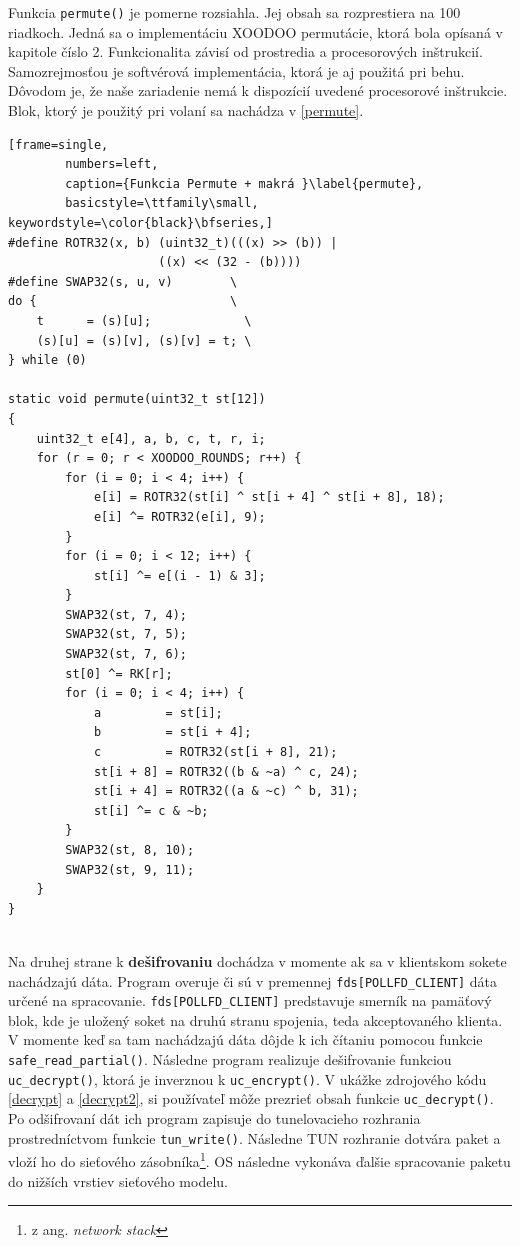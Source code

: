 Funkcia \lstinline|permute()| je pomerne rozsiahla. Jej obsah sa rozprestiera na 100 riadkoch. Jedná sa o implementáciu XOODOO permutácie, ktorá bola opísaná v kapitole číslo 2. Funkcionalita závisí od prostredia a procesorových inštrukcií. Samozrejmosťou je softvérová implementácia, ktorá je aj použitá pri behu. Dôvodom je, že naše zariadenie nemá k dispozícií uvedené procesorové inštrukcie. Blok, ktorý je použitý pri volaní sa nachádza v \ref{permute}.   

\begin{minipage}{\linewidth} 	
	\begin{lstlisting}[frame=single,
		numbers=left,
		caption={Funkcia Permute + makrá }\label{permute},
		basicstyle=\ttfamily\small, keywordstyle=\color{black}\bfseries,]
#define ROTR32(x, b) (uint32_t)(((x) >> (b)) | 
                     ((x) << (32 - (b))))
#define SWAP32(s, u, v)        \
do {                           \
	t      = (s)[u];             \
	(s)[u] = (s)[v], (s)[v] = t; \
} while (0)
	
static void permute(uint32_t st[12])
{
	uint32_t e[4], a, b, c, t, r, i;	
	for (r = 0; r < XOODOO_ROUNDS; r++) {
		for (i = 0; i < 4; i++) {
			e[i] = ROTR32(st[i] ^ st[i + 4] ^ st[i + 8], 18);
			e[i] ^= ROTR32(e[i], 9);
		}
		for (i = 0; i < 12; i++) {
			st[i] ^= e[(i - 1) & 3];
		}
		SWAP32(st, 7, 4);
		SWAP32(st, 7, 5);
		SWAP32(st, 7, 6);
		st[0] ^= RK[r];
		for (i = 0; i < 4; i++) {
			a         = st[i];
			b         = st[i + 4];
			c         = ROTR32(st[i + 8], 21);
			st[i + 8] = ROTR32((b & ~a) ^ c, 24);
			st[i + 4] = ROTR32((a & ~c) ^ b, 31);
			st[i] ^= c & ~b;
		}
		SWAP32(st, 8, 10);
		SWAP32(st, 9, 11);
	}	
}
	\end{lstlisting}
\end{minipage}\\
Na druhej strane k \textbf{dešifrovaniu} dochádza v momente ak sa v klientskom sokete nachádzajú dáta. Program overuje či sú v premennej \lstinline|fds[POLLFD_CLIENT]| dáta určené na spracovanie. \lstinline|fds[POLLFD_CLIENT]| predstavuje smerník na pamäťový blok, kde je uložený soket na druhú stranu spojenia, teda akceptovaného klienta. V momente keď sa tam nachádzajú dáta dôjde k ich čítaniu pomocou funkcie \lstinline|safe_read_partial()|. Následne program realizuje dešifrovanie funkciou \lstinline|uc_decrypt()|, ktorá je inverznou k \lstinline|uc_encrypt()|. V ukážke zdrojového kódu \ref{decrypt} a \ref{decrypt2}, si používateľ môže prezrieť obsah funkcie \lstinline|uc_decrypt()|. Po odšifrovaní dát ich program zapisuje do tunelovacieho rozhrania prostredníctvom funkcie \lstinline|tun_write()|. Následne TUN rozhranie dotvára paket a vloží ho do sieťového zásobníka\footnote{z ang. \textit{network stack}}. OS následne vykonáva ďalšie spracovanie paketu do nižších vrstiev sieťového modelu. 

